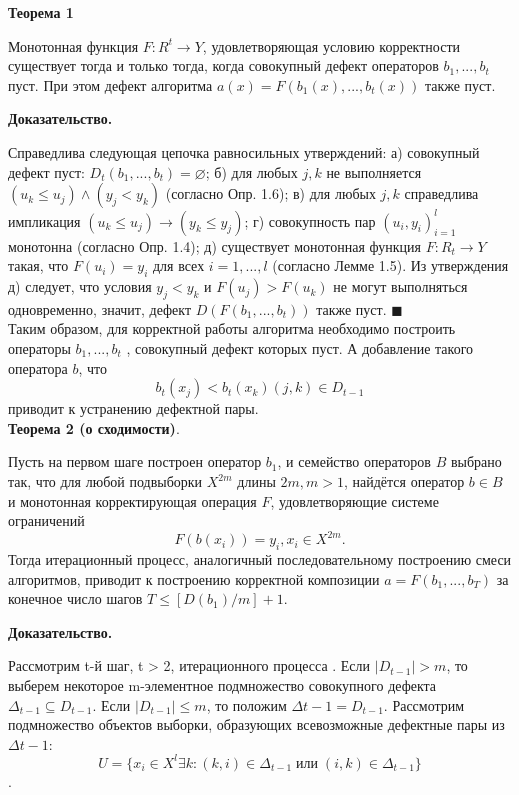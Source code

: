 \textbf{
    Теорема 1}

Монотонная функция $F : R^t \rightarrow Y $, удовлетворяющая условию корректности существует тогда и только тогда, когда совокупный дефект операторов $b_1, . . . , b_t$ пуст. При этом дефект алгоритма $a(x) = F(b_1(x), . . . , b_t(x)) $ также пуст.


\textbf{Доказательство.}

Справедлива следующая цепочка равносильных утверждений:
а) совокупный дефект пуст: $D_t(b_1, . . . , b_t) = \varnothing$;
б) для любых $j, k$ не выполняется $(u_k \leq u_j ) \wedge (y_j < y_k)$ (согласно Опр. 1.6);
в) для любых $j, k$ справедлива импликация $(u_k \leq u_j ) \rightarrow (y_k \leq y_j )$;
г) совокупность пар $(u_i, y_i)^l_{i=1}$ монотонна (согласно Опр. 1.4);
д) существует монотонная функция $F : R_t \rightarrow Y$ такая, что $F(u_i) = y_i$ для всех
$i = 1, . . . , l$ (согласно Лемме 1.5).
Из утверждения д) следует, что условия $y_j < y_k$ и $F(u_j ) > F(u_k)$ не могут
выполняться одновременно, значит, дефект $D(F(b_1, . . . , b_t))$ также пуст. $\blacksquare$\\


Таким образом, для корректной работы алгоритма необходимо построить операторы $ b_1, . . . , b_t$
, совокупный дефект которых пуст. А добавление такого оператора $b$, что
\begin{equation}\label{iter}
    b_t (x_j) < b_t(x_k) (j, k) \in D_{t-1}
\end{equation}
приводит к устранению дефектной пары.\\

\textbf{Теорема 2 (о сходимости)}.

Пусть на первом шаге построен оператор $b_1$, и семейство операторов $B$ выбрано так, что для любой подвыборки $X^{2m}$
длины $2m, m > 1$, найдётся оператор $b\in B$ и монотонная корректирующая операция $F$, удовлетворяющие системе ограничений
\[
    F(b(x_i)) = y_i
    , x_i \in X^{2m}.\]
Тогда итерационный процесс, аналогичный последовательному построению смеси алгоритмов, приводит к построению корректной композиции
$a = F(b_1, . . . , b_T )$ за конечное число шагов $T \leq [D(b_1)/m]+ 1$.


\textbf{Доказательство.}

Рассмотрим t-й шаг, t > 2, итерационного процесса . Если $\vert D_{t-1}\vert > m$,
то выберем некоторое m-элементное подмножество совокупного дефекта $\Delta_{t-1} \subseteq D_{t-1}$.
Если $\vert D_{t-1}\vert \leq m$, то положим $\Delta{t-1} = D_{t-1}$. Рассмотрим подмножество объектов
выборки, образующих всевозможные дефектные пары из $\Delta{t-1}$:
\[ U = \lbrace x_i \in X^l \exists k : (k, i) \in \Delta_{t-1} \; \text{или} \; (i, k) \in \Delta_{t-1} \rbrace\].

